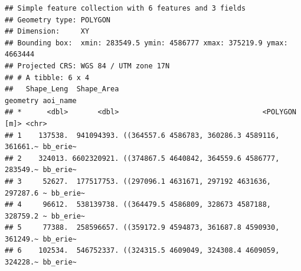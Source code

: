 \documentclass[
]{article}
\newenvironment{Shaded}{\begin{snugshade}}{\end{snugshade}}
\newcommand{\AttributeTok}[1]{\textcolor[rgb]{0.13,0.29,0.53}{#1}}
\newcommand{\CommentTok}[1]{\textcolor[rgb]{0.56,0.35,0.01}{\textit{#1}}}
\newcommand{\ConstantTok}[1]{\textcolor[rgb]{0.56,0.35,0.01}{#1}}
\newcommand{\FunctionTok}[1]{\textcolor[rgb]{0.13,0.29,0.53}{\textbf{#1}}}
\newcommand{\NormalTok}[1]{#1}
\newcommand{\OtherTok}[1]{\textcolor[rgb]{0.56,0.35,0.01}{#1}}
\newcommand{\SpecialCharTok}[1]{\textcolor[rgb]{0.81,0.36,0.00}{\textbf{#1}}}
\newcommand{\StringTok}[1]{\textcolor[rgb]{0.31,0.60,0.02}{#1}}
\begin{document}
\begin{Shaded}
\end{Shaded}

\begin{verbatim}
## Simple feature collection with 6 features and 3 fields
## Geometry type: POLYGON
## Dimension:     XY
## Bounding box:  xmin: 283549.5 ymin: 4586777 xmax: 375219.9 ymax: 4663444
## Projected CRS: WGS 84 / UTM zone 17N
## # A tibble: 6 x 4
##   Shape_Leng  Shape_Area                                       geometry aoi_name
## *      <dbl>       <dbl>                                  <POLYGON [m]> <chr>   
## 1    137538.  941094393. ((364557.6 4586783, 360286.3 4589116, 361661.~ bb_erie~
## 2    324013. 6602320921. ((374867.5 4640842, 364559.6 4586777, 283549.~ bb_erie~
## 3     52627.  177517753. ((297096.1 4631671, 297192 4631636, 297287.6 ~ bb_erie~
## 4     96612.  538139738. ((364479.5 4586809, 328673 4587188, 328759.2 ~ bb_erie~
## 5     77388.  258596657. ((359172.9 4594873, 361687.8 4590930, 361249.~ bb_erie~
## 6    102534.  546752337. ((324315.5 4609049, 324308.4 4609059, 324228.~ bb_erie~
\end{verbatim}
\end{document}
